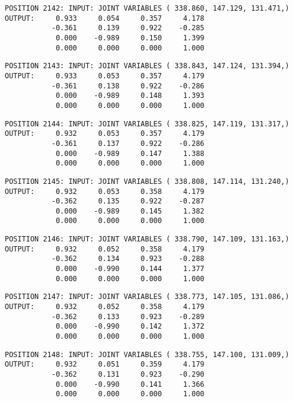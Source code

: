 \begin{verbatim}
POSITION 2142: INPUT: JOINT VARIABLES ( 338.860, 147.129, 131.471,)
OUTPUT:     0.933     0.054     0.357     4.178
           -0.361     0.139     0.922    -0.285
            0.000    -0.989     0.150     1.399
            0.000     0.000     0.000     1.000
\end{verbatim} \pagebreak[1]\begin{verbatim}
POSITION 2143: INPUT: JOINT VARIABLES ( 338.843, 147.124, 131.394,)
OUTPUT:     0.933     0.053     0.357     4.179
           -0.361     0.138     0.922    -0.286
            0.000    -0.989     0.148     1.393
            0.000     0.000     0.000     1.000
\end{verbatim} \pagebreak[1]\begin{verbatim}
POSITION 2144: INPUT: JOINT VARIABLES ( 338.825, 147.119, 131.317,)
OUTPUT:     0.932     0.053     0.357     4.179
           -0.361     0.137     0.922    -0.286
            0.000    -0.989     0.147     1.388
            0.000     0.000     0.000     1.000
\end{verbatim} \pagebreak[1]\begin{verbatim}
POSITION 2145: INPUT: JOINT VARIABLES ( 338.808, 147.114, 131.240,)
OUTPUT:     0.932     0.053     0.358     4.179
           -0.362     0.135     0.922    -0.287
            0.000    -0.989     0.145     1.382
            0.000     0.000     0.000     1.000
\end{verbatim} \pagebreak[1]\begin{verbatim}
POSITION 2146: INPUT: JOINT VARIABLES ( 338.790, 147.109, 131.163,)
OUTPUT:     0.932     0.052     0.358     4.179
           -0.362     0.134     0.923    -0.288
            0.000    -0.990     0.144     1.377
            0.000     0.000     0.000     1.000
\end{verbatim} \pagebreak[1]\begin{verbatim}
POSITION 2147: INPUT: JOINT VARIABLES ( 338.773, 147.105, 131.086,)
OUTPUT:     0.932     0.052     0.358     4.179
           -0.362     0.133     0.923    -0.289
            0.000    -0.990     0.142     1.372
            0.000     0.000     0.000     1.000
\end{verbatim} \pagebreak[1]\begin{verbatim}
POSITION 2148: INPUT: JOINT VARIABLES ( 338.755, 147.100, 131.009,)
OUTPUT:     0.932     0.051     0.359     4.179
           -0.362     0.131     0.923    -0.290
            0.000    -0.990     0.141     1.366
            0.000     0.000     0.000     1.000
\end{verbatim} \pagebreak[1]\begin{verbatim}

\end{verbatim}
